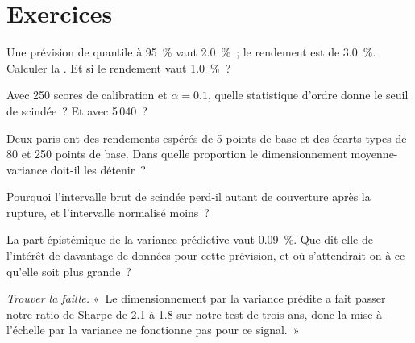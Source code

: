 \section{Exercices}

\begin{exercise}[$\star$]\label{exo:ml:probabilistic-models-and-uncertainty:1}
Une prévision de quantile à 95~\% vaut 2.0~\%~; le rendement est de 3.0~\%. Calculer la . Et si le rendement vaut 1.0~\%~?
\end{exercise}

\begin{exercise}[$\star$]\label{exo:ml:probabilistic-models-and-uncertainty:2}
Avec 250 scores de calibration et $\alpha = 0.1$, quelle statistique d'ordre donne le seuil de  scindée~? Et avec 5\,040~?
\end{exercise}

\begin{exercise}[$\star$]\label{exo:ml:probabilistic-models-and-uncertainty:3}
Deux paris ont des rendements espérés de 5 points de base et des écarts types de 80 et 250 points de base. Dans quelle proportion
le dimensionnement moyenne-variance doit-il les détenir~?
\end{exercise}

\begin{exercise}[$\star\star$]\label{exo:ml:probabilistic-models-and-uncertainty:4}
Pourquoi l'intervalle brut de  scindée perd-il autant de couverture après la rupture, et l'intervalle normalisé moins~?
\end{exercise}

\begin{exercise}[$\star\star$]\label{exo:ml:probabilistic-models-and-uncertainty:5}
La part épistémique de la variance prédictive vaut 0.09~\%. Que dit-elle de l'intérêt de davantage de données pour cette
prévision, et où s'attendrait-on à ce qu'elle soit plus grande~?
\end{exercise}

\begin{exercise}[$\star\star$]\label{exo:ml:probabilistic-models-and-uncertainty:6}
\emph{Trouver la faille.} «~Le dimensionnement par la variance prédite a fait passer notre ratio de Sharpe de 2.1 à 1.8 sur notre test de
trois ans, donc la mise à l'échelle par la variance ne fonctionne pas pour ce signal.~»
\end{exercise}


